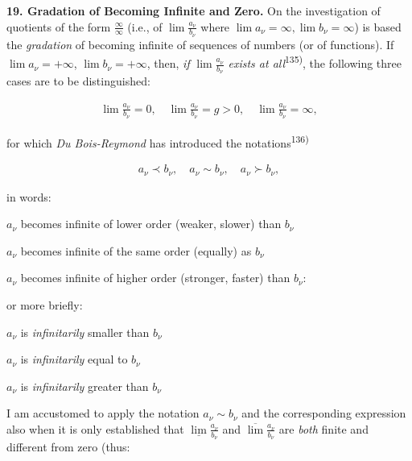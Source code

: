 \thispagestyle{fancy}

\vspace{0.5cm}

\textbf{19. Gradation of Becoming Infinite and Zero.} On the investigation of quotients of the form $\frac{\infty}{\infty}$ (i.e., of $\lim \frac{a_\nu}{b_\nu}$ where $\lim a_\nu = \infty, \lim b_\nu = \infty$) is based the \textit{gradation} of becoming infinite of sequences of numbers (or of functions). If $\lim a_\nu = +\infty$, $\lim b_\nu = +\infty$, then, \textit{if} $\lim \frac{a_\nu}{b_\nu}$ \textit{exists at all}\textsuperscript{135)}, the following three cases are to be distinguished:

\vspace{-0.5cm}
\begin{align}
    \lim \frac{a_\nu}{b_\nu} = 0, \quad \lim \frac{a_\nu}{b_\nu} = g > 0, \quad \lim \frac{a_\nu}{b_\nu} = \infty,
\end{align}
\vspace{-0.5cm}

for which \textit{Du Bois-Reymond} has introduced the notations\textsuperscript{136)}

\vspace{-0.7cm}
\begin{align}
    a_\nu \prec b_\nu, \quad a_\nu \sim b_\nu, \quad a_\nu \succ b_\nu,
\end{align}
\vspace{-0.7cm}

in words:

$a_\nu$ becomes infinite of lower order (weaker, slower) than $b_\nu$

$a_\nu$ becomes infinite of the same order (equally) as $b_\nu$

$a_\nu$ becomes infinite of higher order (stronger, faster) than $b_\nu$:

or more briefly:

\vspace{-0.5cm}
\begin{center}
    $a_\nu$ is \textit{infinitarily} smaller than $b_\nu$
    
    $a_\nu$ is \textit{infinitarily} equal to $b_\nu$
    
    $a_\nu$ is \textit{infinitarily} greater than $b_\nu$
\end{center}

I am accustomed to apply the notation $a_\nu \sim b_\nu$ and the corresponding expression also when it is only established that $\underline{\lim} \frac{a_\nu}{b_\nu}$ and $\overline{\lim} \frac{a_\nu}{b_\nu}$ are \textit{both} finite and different from zero (thus: 

